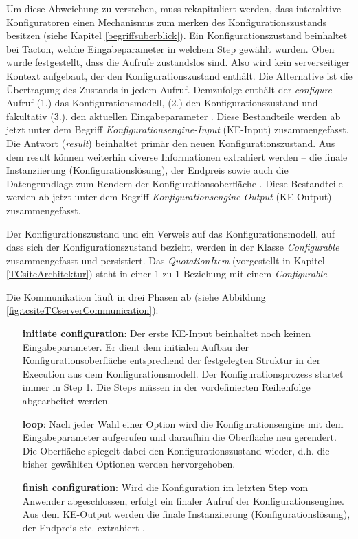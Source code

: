 \documentclass[11pt, a4paper, titlepage, listof=totoc, bibliography=totoc, index=totoc, twoside, openright, headings=normal]{scrreprt}
\begin{document}
Um diese Abweichung zu verstehen, muss rekapituliert werden, dass interaktive Konfiguratoren einen Mechanismus zum merken des Konfigurationszustands besitzen (siehe Kapitel \ref{begriffsuberblick}). Ein Konfigurationszustand beinhaltet bei Tacton, welche Eingabeparameter in welchem Step gewählt wurden. Oben wurde festgestellt, dass die Aufrufe zustandslos sind. Also wird kein serverseitiger Kontext aufgebaut, der den Konfigurationszustand enthält. Die Alternative ist die Übertragung des Zustands in jedem Aufruf. Demzufolge enthält der \emph{configure}-Aufruf (1.) das Konfigurationsmodell, (2.) den Konfigurationszustand und fakultativ (3.), den aktuellen Eingabeparameter \citep{tactonTCsiteApiDocu}. Diese Bestandteile werden ab jetzt unter dem Begriff \emph{Konfigurationsengine-Input} (KE-Input) zusammengefasst. Die Antwort (\emph{result}) beinhaltet primär den neuen Konfigurationszustand. Aus dem result können weiterhin diverse Informationen extrahiert werden --  die finale Instanziierung (Konfigurationslösung), der Endpreis sowie auch die Datengrundlage zum Rendern der Konfigurationsoberfläche \citep{tactonTCsiteApiDocu}. Diese Bestandteile werden ab jetzt unter dem Begriff \emph{Konfigurationsengine-Output} (KE-Output) zusammengefasst.

Der Konfigurationszustand und ein Verweis auf das Konfigurationsmodell, auf dass sich der Konfigurationszustand bezieht, werden in der Klasse \emph{Configurable} zusammengefasst und persistiert. Das \emph{QuotationItem} (vorgestellt in Kapitel  \ref{TCsiteArchitektur}) steht in einer 1-zu-1 Beziehung mit einem \emph{Configurable}.

Die Kommunikation läuft in drei Phasen ab (siehe Abbildung \ref{fig:tcsiteTCserverCommunication}):
\begin{enumerate}
\item[\textbf{initiate configuration}:]Der erste KE-Input beinhaltet noch keinen Eingabeparameter. Er dient dem initialen Aufbau der Konfigurationsoberfläche entsprechend der festgelegten Struktur in der Execution aus dem Konfigurationsmodell. Der Konfigurationsprozess startet immer in Step 1. Die Steps müssen in der vordefinierten Reihenfolge abgearbeitet werden.
\item[\textbf{loop}:] Nach jeder Wahl einer Option wird die Konfigurationsengine mit dem Eingabeparameter aufgerufen und daraufhin die Oberfläche neu gerendert. Die Oberfläche spiegelt dabei den Konfigurationszustand wieder, d.h. die bisher gewählten Optionen werden hervorgehoben.
\item[\textbf{finish configuration}:] Wird die Konfiguration im letzten Step vom Anwender abgeschlossen, erfolgt ein finaler Aufruf der Konfigurationsengine. Aus dem KE-Output werden die finale Instanziierung (Konfigurationslösung), der Endpreis etc. extrahiert \citep{tactonTCsiteDevelopmentManual}.
\end{enumerate}
\end{document}
